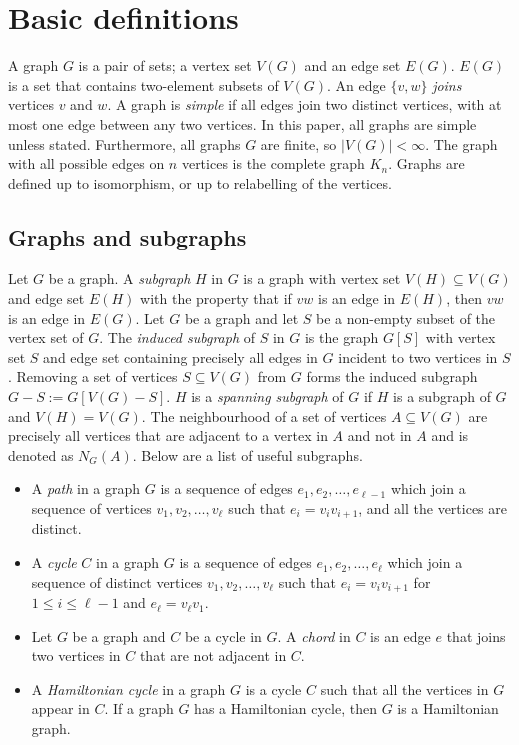 
\section{Basic definitions}\label{sec: Basic definitions}
A graph $G$ is a pair of sets; a vertex set $V(G)$ and an edge set $E(G)$. $E(G)$ is a set that contains two-element subsets of $V(G)$. An edge $ \{v, w\}$ \textit{joins} vertices $v$ and $w$. A graph is \textit{simple} if all edges join two distinct vertices, with at most one edge between any two vertices. In this paper, all graphs are simple unless stated. Furthermore, all graphs $G$ are finite, so $|V(G)| < \infty$. The graph with all possible edges on $n$ vertices is the complete graph $K_n$. Graphs are defined up to isomorphism, or up to relabelling of the vertices. 

\subsection{Graphs and subgraphs}
Let $G$ be a graph. A \textit{subgraph} $H$ in $G$ is a graph with vertex set $V(H) \subseteq V(G)$ and edge set $E(H)$ with the property that if $vw$ is an edge in $E(H)$, then $vw$ is an edge in $E(G)$.
Let $G$ be a graph and let $S$ be a non-empty subset of the vertex set of $G$. The \textit{induced subgraph} of $S$ in $G$ is the graph $G[S]$ with vertex set $S$ and edge set containing precisely all edges in $G$ incident to two vertices in $S$. Removing a set of vertices $S \subseteq V(G)$ from $G$ forms the induced subgraph $G - S := G[V(G) - S]$. 
$H$ is a \textit{spanning subgraph} of $G$ if $H$ is a subgraph of $G$ and $V(H) = V(G)$. 
The neighbourhood of a set of vertices $A \subseteq V(G)$ are precisely all vertices that are adjacent to a vertex in $A$ and not in $A$ and is denoted as $N_G(A)$. Below are a list of useful subgraphs.

\begin{itemize}
	\item A \textit{path} in a graph \(G\) is a sequence of edges \(e_1, e_2, \ldots, e_{\ell- 1}\) which join a sequence of vertices \(v_1, v_2, \ldots, v_{\ell}\) such that \(e_i = v_i v_{i + 1}\), and all the vertices are distinct.
	\item A \textit{cycle} \(C\) in a graph \(G\) is a sequence of edges \(e_1, e_2, \ldots, e_{\ell}\) which join a sequence of distinct vertices \(v_1, v_2, \ldots, v_{\ell}\) such that \(e_i = v_i v_{i + 1}\) for \(1 \leq i \leq \ell - 1\) and \(e_\ell = v_\ell v_1\).
	\item Let $G$ be a graph and $C$ be a cycle in $G$. A \textit{chord} in $C$ is an edge $e$ that joins two vertices in $C$ that are not adjacent in $C$. 
	\item A \textit{Hamiltonian cycle} in a graph \(G\) is a cycle \(C\) such that all the vertices in \(G\) appear in \(C\). If a graph $G$ has a Hamiltonian cycle, then $G$ is a Hamiltonian graph. 
\end{itemize}

